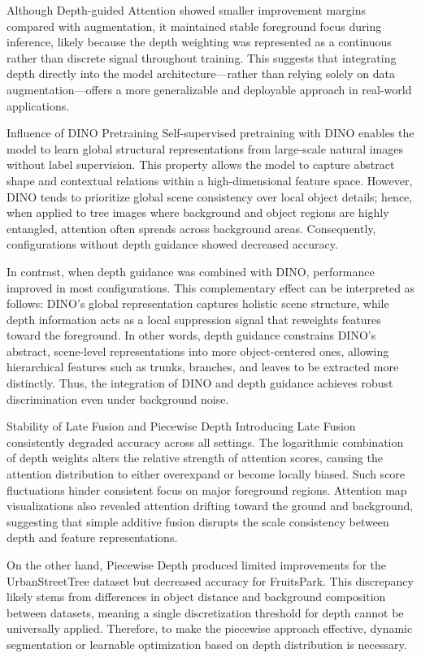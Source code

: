 \documentclass{article}
\begin{document}
Although Depth-guided Attention showed smaller improvement margins compared with augmentation, it maintained stable foreground focus during inference, likely because the depth weighting was represented as a continuous rather than discrete signal throughout training. This suggests that integrating depth directly into the model architecture—rather than relying solely on data augmentation—offers a more generalizable and deployable approach in real-world applications.

Influence of DINO Pretraining
Self-supervised pretraining with DINO \cite{ref13} enables the model to learn global structural representations from large-scale natural images without label supervision. This property allows the model to capture abstract shape and contextual relations within a high-dimensional feature space. However, DINO tends to prioritize global scene consistency over local object details; hence, when applied to tree images where background and object regions are highly entangled, attention often spreads across background areas. Consequently, configurations without depth guidance showed decreased accuracy.

In contrast, when depth guidance was combined with DINO, performance improved in most configurations. This complementary effect can be interpreted as follows: DINO’s global representation captures holistic scene structure, while depth information acts as a local suppression signal that reweights features toward the foreground. In other words, depth guidance constrains DINO’s abstract, scene-level representations into more object-centered ones, allowing hierarchical features such as trunks, branches, and leaves to be extracted more distinctly. Thus, the integration of DINO and depth guidance achieves robust discrimination even under background noise.

Stability of Late Fusion and Piecewise Depth
Introducing Late Fusion consistently degraded accuracy across all settings. The logarithmic combination of depth weights alters the relative strength of attention scores, causing the attention distribution to either overexpand or become locally biased. Such score fluctuations hinder consistent focus on major foreground regions. Attention map visualizations also revealed attention drifting toward the ground and background, suggesting that simple additive fusion disrupts the scale consistency between depth and feature representations.

On the other hand, Piecewise Depth produced limited improvements for the UrbanStreetTree dataset but decreased accuracy for FruitsPark. This discrepancy likely stems from differences in object distance and background composition between datasets, meaning a single discretization threshold for depth cannot be universally applied. Therefore, to make the piecewise approach effective, dynamic segmentation or learnable optimization based on depth distribution is necessary.
\end{document}
